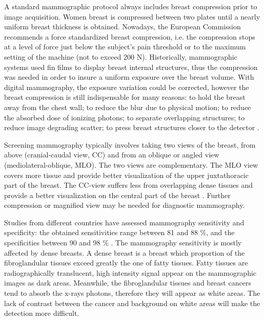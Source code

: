 A standard mammographic protocol always includes breast compression prior to image acquisition. Women breast is compressed between two plates until a nearly uniform breast thickness is obtained. Nowadays, the European Commission recommends a force standardized breast compression, i.e. the compression stops at a level of force just below the subject’s pain threshold or to the maximum setting of the machine (not to exceed 200 N). Historically, mammographic systems used fin films to display breast internal structures, thus the compression was needed in order to insure a uniform exposure over the breast volume. With digital mammography, the exposure variation could be corrected, however the breast compression is still indispensable for many reasons: to hold the breast away from the chest wall; to reduce the blur due to physical motion; to reduce the absorbed dose of ionizing photons; to separate overlapping structures; to reduce image degrading scatter; to press breast structures closer to the detector \citep{kopans2007breast}.

Screening mammography typically involves taking two views of the breast, from above (cranial-caudal view, CC) and from an oblique or angled view (mediolateral-oblique, MLO). The two views are complementary. The MLO view covers more tissue and provide better visualization of the upper juxtathoracic part of the breast. The CC-view suffers less from overlapping dense tissues and provide a better visualization on the central part of the breast \citep{chan_image_1987}.  Further compression or magnified view may be needed for diagnostic mammography.
 
Studies from different countries have assessed mammography sensitivity and specificity: the obtained sensitivities range between 81 and 88 \%, and the specificities between 90 and 98 \% \citep{kemp_comparing_2015,hofvind_sensitivity_2012}. The mammography sensitivity is mostly affected by dense breasts. A dense breast is a breast which proportion of the fibroglandular tissues exceed greatly the one of fatty tissues. Fatty tissues are radiographically translucent, high intensity signal appear on the mammographic images as dark areas. Meanwhile, the fibroglandular tissues and breast cancers tend to absorb the x-rays photons, therefore they will appear as white areas. The lack of contrast between the cancer and background on white areas will make the detection more difficult.      
 

